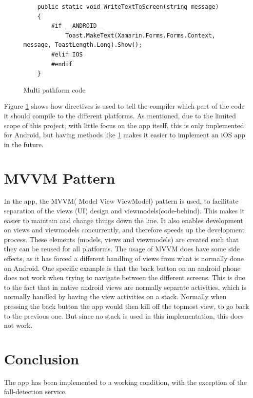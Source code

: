 \begin{figure}[h]
    \centering
    \begin{lstlisting}
    public static void WriteTextToScreen(string message)
    {
        #if __ANDROID__
            Toast.MakeText(Xamarin.Forms.Forms.Context, message, ToastLength.Long).Show();
        #elif IOS
        #endif
    }
    \end{lstlisting}
    \caption{Multi pathform code}
    \label{fig:appMultiPlatform}
\end{figure}

Figure \ref{fig:appMultiPlatform} shows how directives is used to tell the compiler which part of the code it should compile to the different platforms. As mentioned, due to the limited scope of this project, with little focus on the app itself, this is only implemented for Android, but having methods like \ref{fig:appMultiPlatform} makes it easier to implement an iOS app in the future.

\section{MVVM Pattern}
In the app, the MVVM( Model View ViewModel) pattern is used, to facilitate separation of the views (UI) design and viewmodels(code-behind). This makes it easier to maintain and change things down the line. It also enables development on views and viewmodels concurrently, and therefore speeds up the development process. These elements (models, views and viewmodels) are created such that they can be reused for all platforms. The usage of MVVM does have some side effects, as it has forced a different handling of views from what is normally done on Android. One specific example is that the back button on an android phone does not work when trying to navigate between the different screens. This is due to the fact that in native android views are normally separate activities, which is normally handled by having the view activities on a stack. Normally when pressing the back button the app would then kill off the topmost view, to go back to the previous one. But since no stack is used in this implementation, this does not work.

\section{Conclusion}
The app has been implemented to a working condition, with the exception of the fall-detection service.

